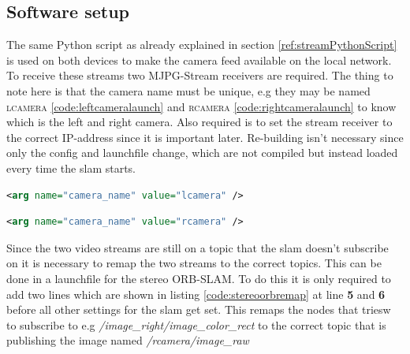 \subsection{Software setup}
The same Python script as already explained in section \ref{ref:streamPythonScript} is used on both devices to make the camera feed available on the local network. To receive these streams two MJPG-Stream receivers are required. The thing to note here is that the camera name must be unique, e.g they may be named \textsc{lcamera} \ref{code:leftcameralaunch} and \textsc{rcamera} \ref{code:rightcameralaunch} to know which is the left and right camera. Also required is to set the stream receiver to the correct IP-address since it is important later. Re-building isn't necessary since only the config and launchfile change, which are not compiled but instead loaded every time the \gls{slam} starts.\newline
\begin{lstlisting}[language=XML,caption={Left camera stream launch file},label={code:leftcameralaunch}]
	  	<arg name="camera_name" value="lcamera" />
\end{lstlisting}
\begin{lstlisting}[language=XML,caption={Right camera stream launch file},label={code:rightcameralaunch}]
	  	<arg name="camera_name" value="rcamera" />
\end{lstlisting}

Since the two video streams are still on a topic that the \gls{slam} doesn't subscribe on it is necessary to remap the two streams to the correct topics. This can be done in a launchfile for the stereo ORB-SLAM.
To do this it is only required to add two lines which are shown in listing \ref{code:stereoorbremap} at line \textbf{5} and \textbf{6} before all other settings for the \gls{slam} get set. This remaps the nodes that triesw to subscribe to e.g \textit{/image\_right/image\_color\_rect} to the correct topic that is publishing the image named \textit{/rcamera/image\_raw} \newline



